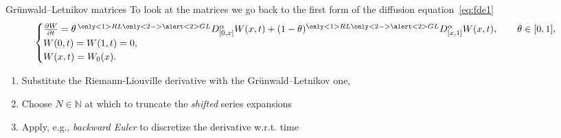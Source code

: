 \documentclass[aspectratio=169,xcolor=dvipsnames]{beamer}
\begin{document}
\begin{frame}{Gr\"unwald--Letnikov matrices}
To look at the matrices we go back to the first form of the diffusion equation~\eqref{eq:fde1}
	\begin{equation*}
	\begin{cases}\frac{\partial W}{\partial t} = \theta\,{}^{\only<1>{RL}\only<2->{\alert<2>{GL}}}D_{[0,x]}^\alpha W(x,t) + (1-\theta) {}^{\only<1>{RL}\only<2->{\alert<2>{GL}}}D_{[x,1]}^\alpha W(x,t), \qquad \theta \in [0,1],\\
	W(0,t) = W(1,t) = 0,\\
	W(x,t) = W_0(x).	
	\end{cases}
	\end{equation*}
\begin{enumerate}
	\item<2-> Substitute the Riemann-Liouville derivative with the \alert<2>{G}r\"unwald--\alert<2>{L}etnikov one,
	\item<3-> Choose $N \in \mathbb{N}$ at which to truncate the \emph{shifted} series expansions
	\only<3>{\[
	h_N^\alpha \, \frac{\partial W_{i}}{\partial t} = \theta \sum_{k=0}^{i+1} (-1)^k \binom{\alpha}{k} W_{i-k+1} + (1-\theta)  \sum_{k=0}^{N-i+2} (-1)^k \binom{\alpha}{k} W_{i+k-1}, \; i=0,\ldots,N.
	\]}
	\item<4-> Apply, e.g., \emph{backward Euler} to discretize the derivative w.r.t. time
	\only<4>{
	\[
	\hspace{-3.2em}\frac{h_N^\alpha}{\Delta t} (W_{i}^{j+1} - W_i^{j}) = \theta \sum_{k=0}^{i-k+1} (-1)^k \binom{\alpha}{k} W_{i-k+1}^{j} + (1-\theta)  \sum_{k=0}^{N+i-2} (-1)^k \binom{\alpha}{k} W_{i+k-1}^j, \begin{array}{l}i=0,\ldots,N,\\j=0,\ldots,M-1.\end{array}
	\]
	}
\end{enumerate}
\end{frame}
\end{document}
